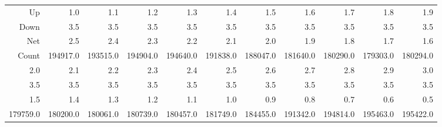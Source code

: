 \begin{tabular}{rrrrrrrrrrr}
\toprule
Up    &       1.0 &       1.1 &       1.2 &       1.3 &       1.4 &       1.5 &       1.6 &       1.7 &       1.8 &       1.9 \\       
Down  &       3.5 &       3.5 &       3.5 &       3.5 &       3.5 &       3.5 &       3.5 &       3.5 &       3.5 &       3.5 \\
Net   &       2.5 &       2.4 &       2.3 &       2.2 &       2.1 &       2.0 &       1.9 &       1.8 &       1.7 &       1.6 \\
Count &  194917.0 &  193515.0 &  194904.0 &  194640.0 &  191838.0 &  188047.0 &  181640.0 &  180290.0 &  179303.0 &  180294.0 \\
\midrule
2.0 &       2.1 &       2.2 &       2.3 &       2.4 &       2.5 &       2.6 &       2.7 &       2.8 &       2.9 &       3.0 \\
3.5	&		3.5 &       3.5 &       3.5 &       3.5 &       3.5 &       3.5 &       3.5 &       3.5 &       3.5 &       3.5 \\
1.5 &       1.4 &       1.3 &       1.2 &       1.1 &       1.0 &       0.9 &       0.8 &       0.7 &       0.6 &       0.5 \\
179759.0 &  180200.0 &  180061.0 &  180739.0 &  180457.0 &  181749.0 &  184455.0 &  191342.0 &  194814.0 &  195463.0 &  195422.0 \\
\bottomrule
\end{tabular}
